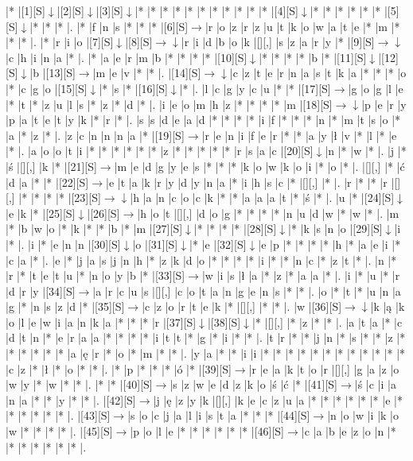 \documentclass[11pt]{article}
\newcommand\drarr{$\rightarrow \!\!\!\!\! \downarrow$}
\newcommand\rarr{$\rightarrow$}
\newcommand\darr{$\downarrow$}
\begin{document}
\noindent\begin{Puzzle}{25}{28}|*	|[1][S]\darr	|[2][S]\darr	|[3][S]\darr	|*	|*	|*	|*	|*	|*	|*	|*	|*	|*	|*	|[4][S]\darr	|*	|*	|*	|*	|*	|*	|[5][S]\darr	|*	|*	|*	|.
|*	|f	|n	|s	|*	|*	|*	|[6][S]\rarr	|r	|o	|z	|r	|z	|u	|t	|k	|o	|w	|a	|t	|e	|*	|m	|*	|*	|*	|.
|*	|r	|i	|o	|[7][S]\darr	|[8][S]\drarr	|r	|i	|d	|b	|o	|k	|[][,]{ }	|s	|z	|a	|r	|y	|*	|[9][S]\drarr	|c	|h	|i	|n	|a	|*	|.
|*	|a	|e	|r	|m	|b	|*	|*	|*	|*	|[10][S]\darr	|*	|*	|*	|*	|b	|*	|[11][S]\darr	|[12][S]\darr	|b	|[13][S]\rarr	|m	|e	|v	|*	|*	|.
|[14][S]\drarr	|c	|z	|t	|e	|r	|n	|a	|s	|t	|k	|a	|*	|*	|*	|o	|*	|c	|g	|o	|[15][S]\darr	|*	|s	|*	|[16][S]\darr	|*	|.
|l	|c	|g	|y	|c	|u	|*	|*	|[17][S]\rarr	|g	|o	|g	|l	|e	|*	|t	|*	|z	|u	|l	|s	|*	|z	|*	|d	|*	|.
|i	|e	|o	|m	|h	|z	|*	|*	|*	|*	|m	|[18][S]\drarr	|p	|e	|r	|y	|p	|a	|t	|e	|t	|y	|k	|*	|r	|*	|.
|s	|s	|d	|e	|a	|d	|*	|*	|*	|*	|i	|f	|*	|*	|*	|n	|*	|m	|t	|s	|o	|*	|a	|*	|z	|*	|.
|z	|c	|n	|n	|n	|a	|*	|[19][S]\rarr	|r	|e	|n	|i	|f	|e	|r	|*	|*	|a	|y	|ł	|v	|*	|l	|*	|e	|*	|.
|a	|o	|o	|t	|i	|*	|*	|*	|*	|*	|*	|z	|*	|*	|*	|*	|*	|r	|s	|a	|c	|[20][S]\darr	|n	|*	|w	|*	|.
|j	|*	|ś	|[][,]{ }	|k	|*	|[21][S]\rarr	|m	|e	|d	|g	|y	|e	|s	|*	|*	|*	|k	|o	|w	|k	|o	|i	|*	|o	|*	|.
|[][,]{ }	|*	|ć	|d	|a	|*	|*	|[22][S]\rarr	|e	|t	|a	|k	|r	|y	|d	|y	|n	|a	|*	|i	|h	|s	|c	|*	|[][,]{ }	|*	|.
|r	|*	|*	|r	|[][,]{ }	|*	|*	|*	|*	|[23][S]\drarr	|h	|a	|n	|c	|o	|c	|k	|*	|*	|a	|a	|a	|t	|*	|ś	|*	|.
|u	|*	|[24][S]\darr	|e	|k	|*	|[25][S]\darr	|[26][S]\rarr	|h	|o	|t	|[][,]{ }	|d	|o	|g	|*	|*	|*	|*	|n	|u	|d	|w	|*	|w	|*	|.
|m	|*	|b	|w	|o	|*	|k	|*	|*	|b	|*	|m	|[27][S]\darr	|*	|*	|*	|*	|[28][S]\darr	|*	|k	|s	|n	|o	|[29][S]\darr	|i	|*	|.
|i	|*	|e	|n	|n	|[30][S]\darr	|o	|[31][S]\darr	|*	|e	|[32][S]\darr	|e	|p	|*	|*	|*	|*	|h	|*	|a	|e	|i	|*	|c	|a	|*	|.
|e	|*	|j	|a	|s	|j	|n	|h	|*	|z	|k	|d	|o	|*	|*	|*	|*	|i	|*	|*	|n	|c	|*	|z	|t	|*	|.
|n	|*	|r	|*	|t	|e	|t	|u	|*	|n	|o	|y	|b	|*	|[33][S]\rarr	|w	|i	|s	|ł	|a	|*	|z	|*	|a	|a	|*	|.
|i	|*	|u	|*	|r	|d	|r	|y	|[34][S]\rarr	|a	|r	|c	|u	|s	|[][,]{ }	|c	|o	|t	|a	|n	|g	|e	|n	|s	|*	|*	|.
|o	|*	|t	|*	|u	|n	|a	|g	|*	|n	|s	|z	|d	|*	|[35][S]\rarr	|c	|z	|o	|r	|t	|e	|k	|*	|[][,]{ }	|*	|*	|.
|w	|[36][S]\drarr	|k	|ą	|k	|o	|l	|e	|w	|i	|a	|n	|k	|a	|*	|*	|*	|r	|[37][S]\darr	|[38][S]\darr	|*	|[][,]{ }	|*	|z	|*	|*	|.
|a	|t	|a	|*	|c	|d	|t	|n	|*	|e	|r	|a	|a	|*	|*	|*	|*	|i	|t	|t	|*	|g	|*	|i	|*	|*	|.
|t	|r	|*	|*	|j	|n	|*	|s	|*	|*	|z	|*	|*	|*	|*	|*	|*	|a	|ę	|r	|*	|o	|*	|m	|*	|*	|.
|y	|a	|*	|*	|i	|i	|*	|*	|*	|*	|*	|*	|*	|*	|*	|*	|*	|*	|c	|z	|*	|ł	|*	|o	|*	|*	|.
|*	|p	|*	|*	|*	|ó	|*	|[39][S]\rarr	|r	|e	|a	|k	|t	|o	|r	|[][,]{ }	|g	|a	|z	|o	|w	|y	|*	|w	|*	|*	|.
|*	|*	|[40][S]\rarr	|s	|z	|w	|e	|d	|z	|k	|o	|ś	|ć	|*	|[41][S]\rarr	|ś	|c	|i	|a	|n	|a	|*	|*	|y	|*	|*	|.
|[42][S]\rarr	|j	|ę	|z	|y	|k	|[][,]{ }	|k	|e	|c	|z	|u	|a	|*	|*	|*	|*	|*	|*	|e	|*	|*	|*	|*	|*	|*	|.
|[43][S]\rarr	|s	|o	|c	|j	|a	|l	|i	|s	|t	|a	|*	|*	|*	|[44][S]\rarr	|n	|o	|w	|i	|k	|o	|w	|*	|*	|*	|*	|.
|[45][S]\rarr	|p	|o	|l	|e	|*	|*	|*	|*	|*	|*	|[46][S]\rarr	|c	|a	|b	|e	|z	|o	|n	|*	|*	|*	|*	|*	|*	|*	|.\end{Puzzle}
\end{document}
